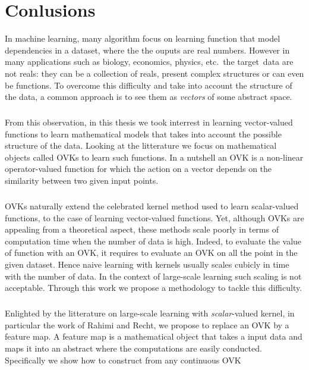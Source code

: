 \chapter{Conlusions}
\bigskip
\begin{justify}
    In machine learning, many algorithm focus on learning function that model
    dependencies in a dataset, where the the ouputs are real numbers. However
    in many applications such as biology, economics, physics, etc.~the
    target~data are not reals: they can be a collection of reals, present
    complex structures or can even be functions. To overcome this difficulty
    and take into account the structure of the data, a common approach is to
    see them as \emph{vectors} of some abstract space.
    \paragraph{}
    From this observation, in this thesis we took interrest in learning
    vector-valued functions to learn mathematical models that takes into
    account the possible structure of the data. Looking at the litterature we
    focus on mathematical objects called \aclp{OVK} to learn such functions.
    In a nutshell an \acs{OVK} is a non-linear operator-valued function for
    which the action on a vector depends on the similarity between two given
    input points.
    \paragraph{}
    \acsp{OVK} naturally extend the celebrated kernel method used to learn
    scalar-valued functions, to the case of learning vector-valued functions.
    Yet, although \acsp{OVK} are appealing from a theoretical aspect, these
    methods scale poorly in terms of computation time when the number of data
    is high. Indeed, to evaluate the value of function with an \acl{OVK}, it
    requires to evaluate an \acl{OVK} on all the point in the given dataset.
    Hence naive learning with kernels usually scales cubicly in time with the
    number of data. In the context of large-scale learning such scaling is not
    acceptable. Through this work we propose a methodology to tackle this
    difficulty.
    \paragraph{}
    Enlighted by the litterature on large-scale learning with
    \emph{scalar}-valued kernel, in particular the work of Rahimi and Recht,
    we propose to replace an \acs{OVK} by a feature map. A feature map is a
    mathematical object that takes a input data and maps it into an abstract
    where the computations are easily conducted. Specifically we show how to
    construct from any continuous \acs{OVK}
\end{justify}
\label{ch:conclusion}

